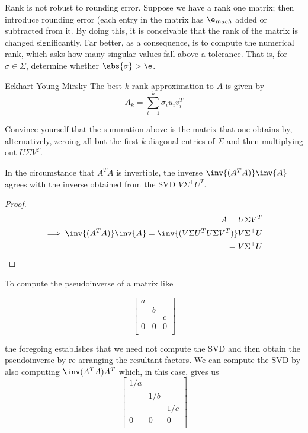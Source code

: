 \documentclass[../main.tex]{subfiles}
\begin{document}
\begin{remark}
    Rank is not robust to rounding error. Suppose we have a rank one matrix; then introduce rounding error (each entry in the matrix has $\e_{mach}$ added or subtracted from it. By doing this, it is conceivable that the rank of the matrix is changed significantly. Far better, as a consequence, is to compute the numerical rank, which asks how many singular values fall above a tolerance. That is, for $\sigma \in \Sigma$, determine whether $\abs{\sigma} > \e$.
\end{remark}

\begin{theorem}{Eckhart Young Mirsky}
   The best $k$ rank approximation to $A$ is given by
   \[
       A_k = \sum_{i=1}^{k}\sigma_{i}u_{i}v_{i}^T
   \]
\end{theorem}
\begin{remark}
       Convince yourself that the summation above is the matrix
       that one obtains by, alternatively, zeroing all but the first
       $k$ diagonal entries of $\Sigma$ and then multiplying out
       $U \Sigma V^T$.
\end{remark}

\begin{proposition}
In the circumstance that $A^TA$ is invertible, the inverse $\inv{(A^TA)}\inv{A}$ agrees with the inverse obtained from the SVD $V \Sigma^{+} U^T$.
\end{proposition}
\begin{proof}
\begin{align*}
    A = U \Sigma V^T \\
    \implies \inv{(A^TA)}\inv{A} = \inv{(V \Sigma U^T U \Sigma V^T)} V \Sigma^{+} U \\
    = V \Sigma^{+} U \\
\end{align*}
\end{proof}

\begin{example}
    To compute the pseudoinverse of a matrix like

    \[
        \begin{bmatrix}
            a & & \\
            & b &  \\
            & & c \\
            0 & 0 &0 \\
        \end{bmatrix}
    \]

    the foregoing establishes that we need not compute the SVD and then obtain the pseudoinverse by re-arranging the resultant factors. We can compute the SVD by also computing $\inv(A^TA)A^T$ which, in this case, gives us
    \[
        \begin{bmatrix}
            1/a & & \\
            & 1/b &  \\
            & & 1/c \\
            0 & 0 &0 \\
        \end{bmatrix}
    \]
\end{example}
\end{document}
